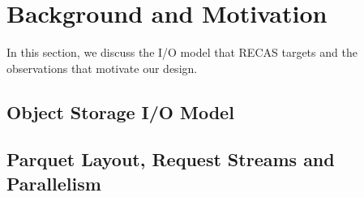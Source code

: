 \section{Background and Motivation}
\label{sec:moti}
In this section, we discuss the I/O model that RECAS targets and the observations that motivate our design.  
\subsection{Object Storage I/O Model}


\subsection{Parquet Layout, Request Streams and Parallelism}

\subsection{}
\subsection{}
\subsection{}